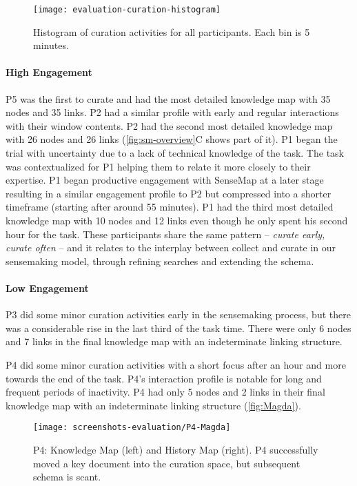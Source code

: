 \begin{figure}[!htb]
	\centering
	\texttt{[image: evaluation-curation-histogram]}
	\caption{Histogram of curation activities for all participants. Each bin is 5 minutes.}
	\label{fig:evaluation-curation-histogram}
\end{figure}

\paragraph{High Engagement}
P5 was the first to curate and had the most detailed knowledge map with 35 nodes and 35 links. P2 had a similar profile with early and regular interactions with their window contents. P2 had the second most detailed knowledge map with 26 nodes and 26 links (\autoref{fig:sm-overview}C shows part of it). P1 began the trial with uncertainty due to a lack of technical knowledge of the task. The task was contextualized for P1 helping them to relate it more closely to their expertise. P1 began productive engagement with SenseMap at a later stage resulting in a similar engagement profile to P2 but compressed into a shorter timeframe (starting after around 55 minutes). P1 had the third most detailed knowledge map with 10 nodes and 12 links even though he only spent his second hour for the task. These participants share the same pattern --  \textit{curate early, curate often} -- and it relates to the interplay between collect and curate in our sensemaking model, through refining searches and extending the schema.

\paragraph{Low Engagement}
P3 did some minor curation activities early in the sensemaking process, but there was a considerable rise in the last third of the task time. There were only 6 nodes and 7 links in the final knowledge map with an indeterminate linking structure.

P4 did some minor curation activities with a short focus after an hour and more towards the end of the task. P4's interaction profile is notable for long and frequent periods of inactivity. P4 had only 5 nodes and 2 links in their final knowledge map with an indeterminate linking structure (\autoref{fig:Magda}).

\begin{figure}[!htb]
	\centering
	\texttt{[image: screenshots-evaluation/P4-Magda]}
	\caption{P4: Knowledge Map (left) and History Map (right). P4 successfully moved a key document into the curation space, but subsequent schema is scant.}
	\label{fig:Magda}
\end{figure}

